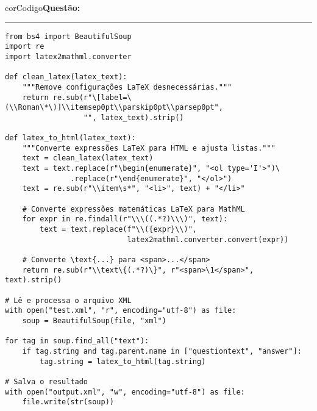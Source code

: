 \begin{listing}[!ht]
  \begin{myboxCode}{corCodigo}{\textbf{Questão: }}\vspace{3mm}
  \hrule
  \begin{verbatim}
from bs4 import BeautifulSoup
import re
import latex2mathml.converter

def clean_latex(latex_text):
    """Remove configurações LaTeX desnecessárias."""
    return re.sub(r"\[label=\(\\Roman\*\)]\\itemsep0pt\\parskip0pt\\parsep0pt", 
                  "", latex_text).strip()

def latex_to_html(latex_text):
    """Converte expressões LaTeX para HTML e ajusta listas."""
    text = clean_latex(latex_text)
    text = text.replace(r"\begin{enumerate}", "<ol type='I'>")\
               .replace(r"\end{enumerate}", "</ol>")
    text = re.sub(r"\\item\s*", "<li>", text) + "</li>"

    # Converte expressões matemáticas LaTeX para MathML
    for expr in re.findall(r"\\\((.*?)\\\)", text):
        text = text.replace(f"\\({expr}\\)", 
                            latex2mathml.converter.convert(expr))

    # Converte \text{...} para <span>...</span>
    return re.sub(r"\\text\{(.*?)\}", r"<span>\1</span>", text).strip()

# Lê e processa o arquivo XML
with open("test.xml", "r", encoding="utf-8") as file:
    soup = BeautifulSoup(file, "xml")

for tag in soup.find_all("text"):
    if tag.string and tag.parent.name in ["questiontext", "answer"]:
        tag.string = latex_to_html(tag.string)

# Salva o resultado
with open("output.xml", "w", encoding="utf-8") as file:
    file.write(str(soup))
\end{verbatim}
\end{myboxCode}
\caption{Código para coverter arquivo XML do formato \LaTeX{} para HTML.}
\label{lst:questaoQM_XML_Latex2HTML}
\end{listing}


